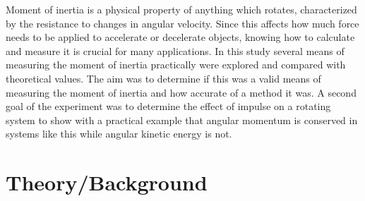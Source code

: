 \documentclass[11pt]{article}
\begin{document}

Moment of inertia is a physical property of anything which rotates, characterized by the resistance
to changes in angular velocity. Since this affects how much force needs to be applied to accelerate or
decelerate objects, knowing how to calculate and measure it is crucial for many applications. In this study several
means of measuring the moment of inertia practically were explored and compared with theoretical values. The aim was
to determine if this was a valid means of measuring the moment of inertia and how accurate of a method it was. 
A second goal of the experiment was to determine the effect of impulse on a rotating system to show
with a practical example that angular momentum is conserved in systems like this while angular kinetic energy is not.
\newpage

\section{Theory/Background}
\end{document}
